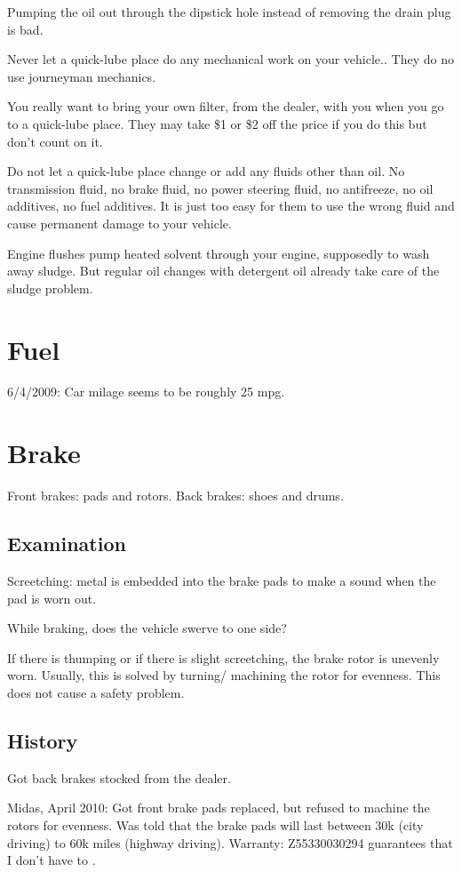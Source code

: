 \documentclass[oneside, article]{memoir}
\begin{document}
Pumping the oil out through the dipstick hole instead of removing the drain plug is bad.

Never let a quick-lube place do any mechanical work on your vehicle.. They do no use journeyman mechanics.

You really want to bring your own filter, from the dealer, with you when you go to a quick-lube place. They may take \$1 or \$2 off the price if you do this but don't count on it.

Do not let a quick-lube place change or add any fluids other than oil. No transmission fluid, no brake fluid, no power steering fluid, no antifreeze, no oil additives, no fuel additives. It is just too easy for them to use the wrong fluid and cause permanent damage to your vehicle.

Engine flushes pump heated solvent through your engine, supposedly to wash away sludge. But regular oil changes with detergent oil already take care of the sludge problem.

\section{Fuel}

6/4/2009: Car milage seems to be roughly 25 mpg.

\section{Brake}
Front brakes: pads and rotors. Back brakes: shoes and drums.

\subsection{Examination}
Screetching: metal is embedded into the brake pads to make a sound when the pad is worn out.

While braking, does the vehicle swerve to one side?

If there is thumping or if there is slight screetching, the brake rotor is unevenly worn. Usually, this is solved by turning/ machining the rotor for evenness. This does not cause a safety problem.

\subsection{History}
Got back brakes stocked from the dealer.

Midas, April 2010: Got front brake pads replaced, but refused to machine the rotors for evenness. Was told that the brake pads will last between 30k (city driving) to 60k miles (highway driving). Warranty: Z55330030294 guarantees that I don't have to .
\end{document}
